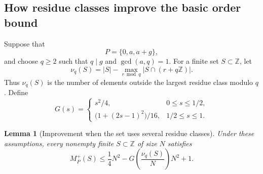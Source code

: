 \documentclass[11pt]{article}
\numberwithin{equation}{section}
\newtheorem{lemma}[lemma]{Lemma}
\theoremstyle{remark}
\newcommand{\Z}{\mathbb Z}
\begin{document}
\subsection{How residue classes improve the basic order bound}
Suppose that
\[
 P=\{0,a,a+g\},
\]
and choose $q\ge2$ such that $q\mid g$ and $\gcd(a,q)=1$.  For a finite
set $S\subset\Z$, let
\begin{equation}\label{eq:def-nu-q}
 \nu_q(S)=|S|-\max_{r\bmod q}|S\cap(r+q\Z)|.
\end{equation}
Thus $\nu_q(S)$ is the number of elements outside the largest residue class
modulo $q$.  Define
\begin{equation}\label{eq:def-G}
 G(s)=
 \begin{cases}
 s^2/4,&0\le s\le1/2,\\[1mm]
 \bigl(1+(2s-1)^2\bigr)/16,&1/2\le s\le1.
 \end{cases}
\end{equation}
\begin{lemma}[Improvement when the set uses several residue classes]
\label{lem:residue-spread}
Under these assumptions, every nonempty finite $S\subset\Z$ of size $N$
satisfies
\begin{equation}\label{eq:residue-spread}
 M_P^+(S)
 \le \frac14N^2-G\left(\frac{\nu_q(S)}N\right)N^2+1.
\end{equation}
\end{lemma}
\end{document}
